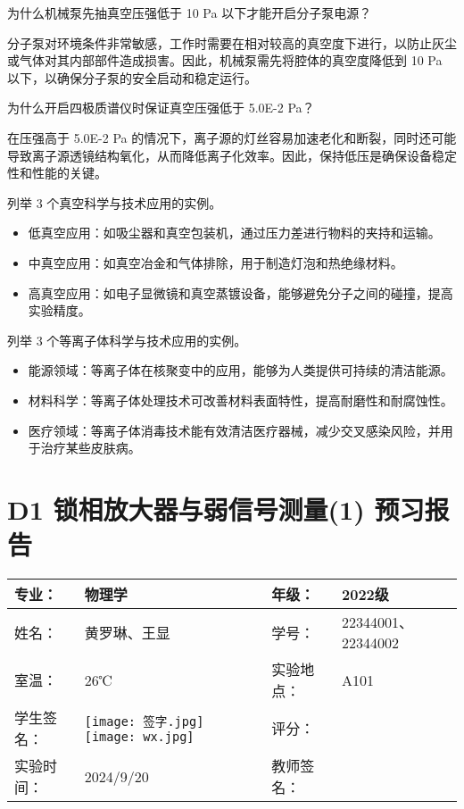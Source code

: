 \documentclass[dvipsnames, svgnames,a4paper,11pt]{article}
\begin{document}
\begin{question}
	为什么机械泵先抽真空压强低于 10 Pa 以下才能开启分子泵电源？
	\end{question}
	分子泵对环境条件非常敏感，工作时需要在相对较高的真空度下进行，以防止灰尘或气体对其内部部件造成损害。因此，机械泵需先将腔体的真空度降低到 10 Pa 以下，以确保分子泵的安全启动和稳定运行。
	
	\begin{question}
	为什么开启四极质谱仪时保证真空压强低于 5.0E-2 Pa？
	\end{question}
	在压强高于 5.0E-2 Pa 的情况下，离子源的灯丝容易加速老化和断裂，同时还可能导致离子源透镜结构氧化，从而降低离子化效率。因此，保持低压是确保设备稳定性和性能的关键。
	
	\begin{question}
	列举 3 个真空科学与技术应用的实例。
	\end{question}
	\begin{itemize}
		\item 低真空应用：如吸尘器和真空包装机，通过压力差进行物料的夹持和运输。
		\item 中真空应用：如真空冶金和气体排除，用于制造灯泡和热绝缘材料。
		\item 高真空应用：如电子显微镜和真空蒸镀设备，能够避免分子之间的碰撞，提高实验精度。
	\end{itemize}
	
	\begin{question}
	列举 3 个等离子体科学与技术应用的实例。
	\end{question}
	\begin{itemize}
		\item 能源领域：等离子体在核聚变中的应用，能够为人类提供可持续的清洁能源。
		\item 材料科学：等离子体处理技术可改善材料表面特性，提高耐磨性和耐腐蚀性。
		\item 医疗领域：等离子体消毒技术能有效清洁医疗器械，减少交叉感染风险，并用于治疗某些皮肤病。
	\end{itemize}
	
	\clearpage
	\section{D1 锁相放大器与弱信号测量(1) \quad\heiti 预习报告}
	
	\clearpage
	\begin{table}
		\renewcommand\arraystretch{1.7}
		\centering
		\begin{tabularx}{\textwidth}{|X|X|X|X|}
			\hline
			专业： & 物理学 & 年级： & 2022级 \\
			\hline
			姓名： &黄罗琳、王显  & 学号： & 22344001、22344002\\
			\hline
			室温： & 26℃ & 实验地点： & A101 \\
			\hline
			学生签名：& \texttt{[image: 签字.jpg]} \texttt{[image: wx.jpg]} & 评分： &\\
			\hline
			实验时间：& 2024/9/20 & 教师签名：&\\
			\hline
		\end{tabularx}
	\end{table}
	
\end{document}

